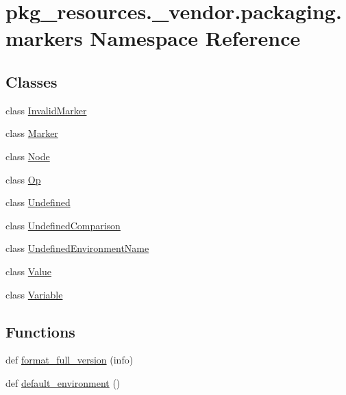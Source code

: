 \hypertarget{namespacepkg__resources_1_1__vendor_1_1packaging_1_1markers}{}\section{pkg\+\_\+resources.\+\_\+vendor.\+packaging.\+markers Namespace Reference}
\label{namespacepkg__resources_1_1__vendor_1_1packaging_1_1markers}
\subsection*{Classes}
\begin{DoxyCompactItemize}
\item 
class \hyperlink{classpkg__resources_1_1__vendor_1_1packaging_1_1markers_1_1InvalidMarker}{Invalid\+Marker}
\item 
class \hyperlink{classpkg__resources_1_1__vendor_1_1packaging_1_1markers_1_1Marker}{Marker}
\item 
class \hyperlink{classpkg__resources_1_1__vendor_1_1packaging_1_1markers_1_1Node}{Node}
\item 
class \hyperlink{classpkg__resources_1_1__vendor_1_1packaging_1_1markers_1_1Op}{Op}
\item 
class \hyperlink{classpkg__resources_1_1__vendor_1_1packaging_1_1markers_1_1Undefined}{Undefined}
\item 
class \hyperlink{classpkg__resources_1_1__vendor_1_1packaging_1_1markers_1_1UndefinedComparison}{Undefined\+Comparison}
\item 
class \hyperlink{classpkg__resources_1_1__vendor_1_1packaging_1_1markers_1_1UndefinedEnvironmentName}{Undefined\+Environment\+Name}
\item 
class \hyperlink{classpkg__resources_1_1__vendor_1_1packaging_1_1markers_1_1Value}{Value}
\item 
class \hyperlink{classpkg__resources_1_1__vendor_1_1packaging_1_1markers_1_1Variable}{Variable}
\end{DoxyCompactItemize}
\subsection*{Functions}
\begin{DoxyCompactItemize}
\item 
def \hyperlink{namespacepkg__resources_1_1__vendor_1_1packaging_1_1markers_a97b11c652ee4b6598521e90bcad4f0e2}{format\+\_\+full\+\_\+version} (info)
\item 
def \hyperlink{namespacepkg__resources_1_1__vendor_1_1packaging_1_1markers_a3d0e91d534c7c8368d344f6be36538df}{default\+\_\+environment} ()
\end{DoxyCompactItemize}
